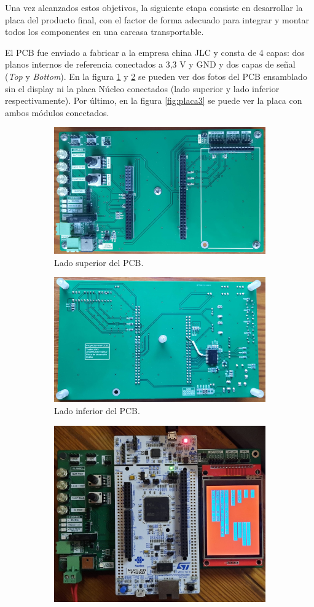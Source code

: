 Una vez alcanzados estos objetivos, la siguiente etapa consiste en desarrollar la placa del producto final, con el factor de forma adecuado para integrar y montar todos los componentes en una carcasa transportable. 

El PCB fue enviado a fabricar a la empresa china JLC y consta de 4 capas: dos planos internos de referencia conectados a 3,3 V y GND y dos capas de señal (\textit{Top} y \textit{Bottom}). En la figura \ref{fig:placa1} y \ref{fig:placa2} se pueden ver dos fotos del PCB ensamblado sin el display ni la placa Núcleo conectados (lado superior y lado inferior respectivamente). Por último, en la figura \ref{fig:placa3} se puede ver la placa con ambos módulos conectados.

\begin{figure}[H]
     \centering
     \begin{subfigure}{\textwidth}
         \centering
         \includegraphics[width=.65\textwidth]{./Figures/placa2.jpg}
         \caption{Lado superior del PCB.}
         \label{fig:placa1}
     \end{subfigure}
     \begin{subfigure}{\textwidth}
         \centering
         \includegraphics[width=.65\textwidth]{./Figures/placa3.jpg}
         \caption{Lado inferior del PCB.}
         \label{fig:placa2}
     \end{subfigure}
     \begin{subfigure}{\textwidth}
         \centering
         \includegraphics[width=.65\textwidth]{./Figures/placa1.jpg}

\end{subfigure}
\end{figure}
